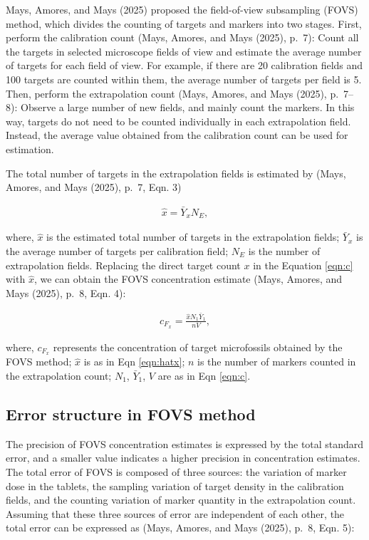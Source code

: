 \documentclass[
  12pt,
]{article}
\begin{document}
Mays, Amores, and Mays (2025) proposed the field-of-view subsampling
(FOVS) method, which divides the counting of targets and markers into
two stages. First, perform the calibration count (Mays, Amores, and Mays
(2025), p.~7): Count all the targets in selected microscope fields of
view and estimate the average number of targets for each field of view.
For example, if there are 20 calibration fields and 100 targets are
counted within them, the average number of targets per field is 5. Then,
perform the extrapolation count (Mays, Amores, and Mays (2025),
p.~7--8): Observe a large number of new fields, and mainly count the
markers. In this way, targets do not need to be counted individually in
each extrapolation field. Instead, the average value obtained from the
calibration count can be used for estimation.

The total number of targets in the extrapolation fields is estimated by
(Mays, Amores, and Mays (2025), p.~7, Eqn. 3)

\begin{align}
\label{eqn:hatx} \hat{x}=\bar{Y}_xN_E,
\end{align}

where, \(\hat{x}\) is the estimated total number of targets in the
extrapolation fields; \(\bar{Y}_x\) is the average number of targets per
calibration field; \(N_E\) is the number of extrapolation fields.
Replacing the direct target count \(x\) in the Equation \eqref{eqn:c}
with \(\hat{x}\), we can obtain the FOVS concentration estimate (Mays,
Amores, and Mays (2025), p.~8, Eqn. 4):

\begin{align}
\label{eqn:cFx} c_{F_x}=\frac{\hat{x}N_1\bar{Y}_1}{nV},
\end{align}

where, \(c_{F_x}\) represents the concentration of target microfossils
obtained by the FOVS method; \(\hat{x}\) is as in Eqn \eqref{eqn:hatx};
\(n\) is the number of markers counted in the extrapolation count;
\(N_1\), \(\bar{Y}_1\), \(V\) are as in Eqn \eqref{eqn:c}.

\subsection{Error structure in FOVS
method}\label{error-structure-in-fovs-method}

The precision of FOVS concentration estimates is expressed by the total
standard error, and a smaller value indicates a higher precision in
concentration estimates. The total error of FOVS is composed of three
sources: the variation of marker dose in the tablets, the sampling
variation of target density in the calibration fields, and the counting
variation of marker quantity in the extrapolation count. Assuming that
these three sources of error are independent of each other, the total
error can be expressed as (Mays, Amores, and Mays (2025), p.~8, Eqn. 5):
\end{document}
